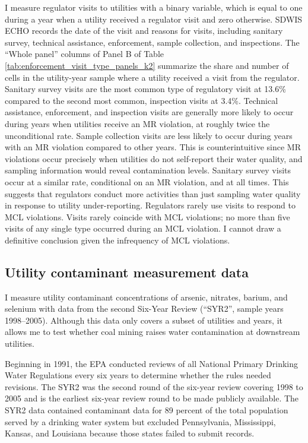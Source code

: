 \documentclass[12pt]{article}
\begin{document}
I measure regulator visits to utilities with a binary variable, which is equal to one during a year when a utility received a regulator visit and zero otherwise. SDWIS ECHO records the date of the visit and reasons for visits, including sanitary survey, technical assistance, enforcement, sample collection, and inspections. The ``Whole panel'' columns of Panel B of Table \ref{tab:enforcement_visit_type_panels_k2} summarize the share and number of cells in the utility-year sample where a utility received a visit from the regulator. Sanitary survey visits are the most common type of regulatory visit at 13.6\% compared to the second most common, inspection visits at 3.4\%. Technical assistance, enforcement, and inspection visits are generally more likely to occur during years when utilities receive an MR violation, at roughly twice the unconditional rate. Sample collection visits are less likely to occur during years with an MR violation compared to other years. This is counterintuitive since MR violations occur precisely when utilities do not self-report their water quality, and sampling information would reveal contamination levels. Sanitary survey visits occur at a similar rate, conditional on an MR violation, and at all times. This suggests that regulators conduct more activities than just sampling water quality in response to utility under-reporting. Regulators rarely use visits to respond to MCL violations. Visits rarely coincide with MCL violations; no more than five visits of any single type occurred during an MCL violation. I cannot draw a definitive conclusion given the infrequency of MCL violations.

\subsection{Utility contaminant measurement data}

I measure utility contaminant concentrations of arsenic, nitrates, barium, and selenium with data from the second Six-Year Review (``SYR2'', sample years 1998--2005). Although this data only covers a subset of utilities and years, it allows me to test whether coal mining raises water contamination at downstream utilities.

Beginning in 1991, the EPA conducted reviews of all National Primary Drinking Water Regulations every six years to determine whether the rules needed revisions. The SYR2 was the second round of the six-year review covering 1998 to 2005 and is the earliest six-year review round to be made publicly available. The SYR2 data contained contaminant data for 89 percent of the total population served by a drinking water system but excluded Pennsylvania, Mississippi, Kansas, and Louisiana because those states failed to submit records. %
\end{document}
